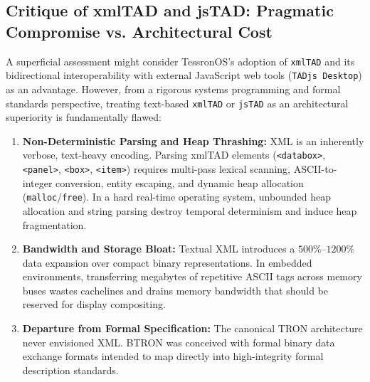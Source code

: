 \documentclass[10pt,journal,compsoc,twocolumn]{article}
\begin{document}
\subsection{Critique of xmlTAD and jsTAD: Pragmatic Compromise vs. Architectural Cost}
A superficial assessment might consider TessronOS's adoption of \texttt{xmlTAD} and its bidirectional interoperability with external JavaScript web tools (\texttt{TADjs Desktop}) as an advantage. However, from a rigorous systems programming and formal standards perspective, treating text-based \texttt{xmlTAD} or \texttt{jsTAD} as an architectural superiority is fundamentally flawed:
\begin{enumerate}[leftmargin=*]
    \item \textbf{Non-Deterministic Parsing and Heap Thrashing:} XML is an inherently verbose, text-heavy encoding. Parsing xmlTAD elements (\texttt{<databox>}, \texttt{<panel>}, \texttt{<box>}, \texttt{<item>}) requires multi-pass lexical scanning, ASCII-to-integer conversion, entity escaping, and dynamic heap allocation (\texttt{malloc}/\texttt{free}). In a hard real-time operating system, unbounded heap allocation and string parsing destroy temporal determinism and induce heap fragmentation.
    \item \textbf{Bandwidth and Storage Bloat:} Textual XML introduces a $500\%\text{--}1200\%$ data expansion over compact binary representations. In embedded environments, transferring megabytes of repetitive ASCII tags across memory buses wastes cachelines and drains memory bandwidth that should be reserved for display compositing.
    \item \textbf{Departure from Formal Specification:} The canonical TRON architecture never envisioned XML. BTRON was conceived with formal binary data exchange formats intended to map directly into high-integrity formal description standards.
\end{enumerate}
\end{document}
